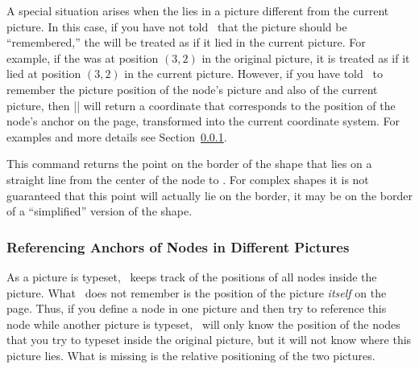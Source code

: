 \begin{command}{\pgfpointanchor{}}
  A special situation arises when the  lies in a picture
  different from the current picture. In this case, if you have not
  told \pgfname\ that the picture should be ``remembered,'' the
   will be treated as if it lied in the current
  picture. For example, if the  was at position $(3,2)$ in
  the original picture, it is treated as if it lied at position
  $(3,2)$ in the current picture. However, if you have told \pgfname\
  to remember the picture position of the node's picture and also of
  the current picture,
  then |\pgfpointanchor| will return a coordinate that corresponds to
  the position of the node's anchor on the page, transformed into the
  current coordinate system. For examples and more details see
  Section~\ref{section-cross-pictures-pgf}. 
\end{command}

\begin{command}{\pgfpointshapeborder{}}
  This command returns the point on the border of the shape that lies
  on a straight line from the center of the node to \meta{point}. For
  complex shapes it is not guaranteed that this point will actually
  lie on the border, it may be on the border of a ``simplified''
  version of the shape.

\begin{codeexample}[]
\begin{pgfpicture}
  \begin{pgfscope}
  \end{pgfscope}
  \pgfpathcircle{\pgfpoint{2cm}{1cm}}{2pt}
  \pgfpathcircle{\pgfpoint{-1cm}{1cm}}{2pt}
\end{pgfpicture}
\end{codeexample}
\end{command}


\subsubsection{Referencing Anchors of Nodes in Different Pictures}
\label{section-cross-pictures-pgf}

As a picture is typeset, \pgfname\ keeps track of the positions of all
nodes inside the picture. What \pgfname\ does not remember is the
position of the picture \emph{itself} on the page. Thus, if you define
a node in one picture and then try to reference this node while
another picture is typeset, \pgfname\ will only know the position of
the nodes that you try to typeset inside the original picture, but it
will not know where this picture lies. What is missing is the relative
positioning of the two pictures.

